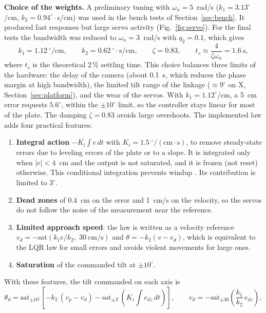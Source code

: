 \documentclass[11pt,letterpaper]{article}
\begin{document}
\textbf{Choice of the weights.} A preliminary tuning with
$\omega_n=5$~rad/s ($k_1=3.13^\circ$/cm, $k_2=0.94^\circ\cdot$s/cm) was
used in the bench tests of Section~\ref{sec:bench}. It produced fast
responses but large servo activity (Fig.~\ref{fig:servo}). For the final
tests the bandwidth was reduced to $\omega_n=3$~rad/s with $q_2=0.1$,
which gives
\begin{equation}
k_1=1.12~^\circ/\mathrm{cm},\qquad k_2=0.62~^\circ\cdot\mathrm{s/cm},
\qquad \zeta = 0.83,\qquad t_s\approx\frac{4}{\zeta\omega_n}=1.6~\mathrm{s},
\label{eq:final}
\end{equation}
where $t_s$ is the theoretical 2\,\% settling time. This choice
balances three limits of the hardware: the delay of the camera
(about 0.1~s, which reduces the phase margin at high bandwidth), the
limited tilt range of the linkage ($\approx9^\circ$ on X,
Section~\ref{sec:platform}), and the wear of the servos. With
$k_1=1.12^\circ$/cm, a 5~cm error requests $5.6^\circ$, within the
$\pm10^\circ$ limit, so the controller stays linear for most of the
plate. The damping $\zeta=0.83$ avoids large overshoots. The
implemented law adds four practical features:
\begin{enumerate}
    \item \textbf{Integral action} $-K_i\int e\,dt$ with
    $K_i=1.5~^\circ/(\mathrm{cm\cdot s})$, to remove steady-state errors
    due to leveling errors of the plate or to a slope. It is integrated
    only when $|e|<4$~cm and the output is not saturated, and it is
    frozen (not reset) otherwise. This conditional integration prevents
    windup \cite{Astrom2021}. Its contribution is limited to $3^\circ$.
    \item \textbf{Dead zones} of 0.4~cm on the error and 1~cm/s on the
    velocity, so the servos do not follow the noise of the measurement
    near the reference.
    \item \textbf{Limited approach speed}: the law is written as a
    velocity reference $v_d=-\mathrm{sat}(k_1e/k_2,\;30~\mathrm{cm/s})$
    and $\theta=-k_2(v-v_d)$, which is equivalent to the LQR law for
    small errors and avoids violent movements for large ones.
    \item \textbf{Saturation} of the commanded tilt at $\pm10^\circ$.
\end{enumerate}
With these features, the tilt commanded on each axis is
\begin{equation}
\theta_d=\mathrm{sat}_{\pm10^\circ}\!\left[-k_2\,(v_p-v_d)-\mathrm{sat}_{\pm3^\circ}\!\left(K_i\!\int e_{dz}\,dt\right)\right],
\qquad
v_d=-\mathrm{sat}_{\pm30}\!\left(\frac{k_1}{k_2}\,e_{dz}\right),
\label{eq:law}
\end{equation}
\end{document}
